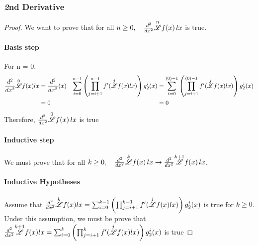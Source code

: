 \documentclass[12pt, letterpaper]{article}
\begin{document}
\subsubsection{\textit{2}nd Derivative} \label{2nd Derivative}
\begin{proof}
    We want to prove that for all $n \ge 0, \quad \frac{d^2}{dx^2}\overset{n}{\mathscr{L}} f(x) \, lx$  is true.

    \paragraph{Basis step}
    For n = 0, 
    \begin{align*}
        \frac{d^2}{dx^2}\overset{0}{\mathscr{L}} f(x) lx &= \frac{d^2}{dx^2}(x) &
        \sum^{n-1}_{i=0}\left(\prod^{n-1}_{j=i+1}f'(\overset{j}{\mathscr{L}}f(x)lx)\right)g^i_2(x) &= \sum^{(0)-1}_{i=0}\left(\prod^{(0)-1}_{j=i+1}f'(\overset{j}{\mathscr{L}}f(x)lx)\right)g^i_2(x) \\
        &= 0 &&= 0\\ 
    \end{align*}
    Therefore, $\frac{d^2}{dx^2}\overset{0}{\mathscr{L}} f(x) \, lx$ is true

    \paragraph{Inductive step}

    We must prove that for all $k \ge 0, \quad \frac{d^2}{dx^2}\overset{k}{\mathscr{L}} f(x) \, lx \to \frac{d^2}{dx^2}\overset{k+1}{\mathscr{L}} f(x) \, lx$.

    \paragraph{Inductive Hypotheses}
    Assume that $\frac{d^2}{dx^2}\overset{k}{\mathscr{L}} f(x) lx = \sum^{k-1}_{i=0}\left(\prod^{k-1}_{j=i+1}f'(\overset{j}{\mathscr{L}}f(x)lx)\right)g^i_2(x)$ is true for $k \ge 0$.
    Under this assumption, we must be prove that $\frac{d^2}{dx^2}\overset{k+1}{\mathscr{L}} f(x) lx = \sum^{k}_{i=0}\left(\prod^{k}_{j=i+1}f'(\overset{j}{\mathscr{L}}f(x)lx)\right)g^i_2(x)$ is true


\end{proof}
\end{document}

